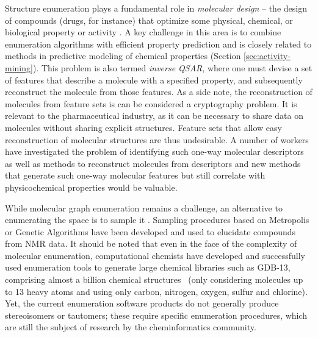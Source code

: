 \documentclass{sig-alternate}
\begin{document}
Structure enumeration plays a fundamental role in \emph{molecular
  design} -- the design of compounds (drugs, for instance) that
optimize some physical, chemical, or biological property or activity
\cite{Schneider:2005uq}. A key challenge in this area is to combine
enumeration algorithms with efficient property prediction and is
closely related to methods in predictive modeling of chemical
properties (Section \ref{sec:activity-mining}). This problem is also
termed \emph{inverse QSAR}, where one must devise a set of features
that describe a molecule with a specified property, and subsequently
reconstruct the molecule from those features. As a side note, the
reconstruction of molecules from feature sets is can be considered a
cryptography problem. It is relevant to the pharmaceutical industry,
as it can be necessary to share data on molecules without sharing
explicit structures. Feature sets that allow easy reconstruction of
molecular structures are thus undesirable. A number of workers have
investigated the problem of identifying such one-way molecular
descriptors as well as methods to reconstruct molecules from
descriptors \cite{Masek:2008kx} and new methods that generate such
one-way molecular features but still correlate with physicochemical
properties would be valuable.

While molecular graph enumeration remains a challenge,
an alternative to enumerating the space is to sample it
\cite{goldberg1999}. Sampling procedures based on Metropolis or
Genetic Algorithms have been developed and used to elucidate
compounds from NMR data. It should be noted that even in the
face of the complexity of molecular enumeration,
computational chemists have developed and successfully used
enumeration tools to generate large chemical libraries such as GDB-13,
comprising almost a billion chemical structures~\cite{GDB} (only
considering molecules up to 13 heavy atoms and using only carbon,
nitrogen, oxygen, sulfur and chlorine). Yet, the current enumeration
software products do not generally produce stereoisomers or tautomers;
these require specific enumeration procedures, which are still the
subject of research by the cheminformatics community.
\end{document}
